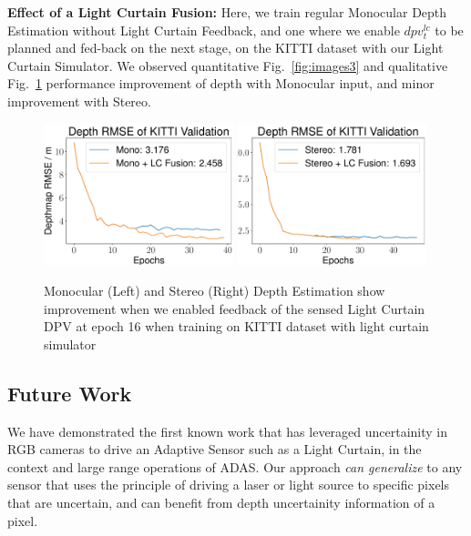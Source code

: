 \textbf{Effect of a Light Curtain Fusion:} Here, we train regular Monocular Depth Estimation without Light Curtain Feedback, and one where we enable $dpv_{t}^{lc}$ to be planned and fed-back on the next stage, on the KITTI dataset with our Light Curtain Simulator. We observed quantitative Fig.~\ref{fig:images3} and qualitative Fig.~\ref{fig:lfusion} performance improvement of depth with Monocular input, and minor improvement with Stereo.

\begin{figure}[h]
  \centering
  \begin{minipage}{0.5\textwidth}
      \centering
      \includegraphics[width=0.49\textwidth]{figures/Figure_10.pdf}
      \includegraphics[width=0.49\textwidth]{figures/Figure_11.pdf}
  \end{minipage}\hfill
  \centering
  \caption{Monocular (Left) and Stereo (Right) Depth Estimation show improvement when we enabled feedback of the sensed Light Curtain DPV at epoch 16 when training on KITTI dataset with light curtain simulator}
  \label{fig:lfusion} 
\end{figure}

\subsection{Future Work}

We have demonstrated the first known work that has leveraged uncertainity in RGB cameras to drive an Adaptive Sensor such as a Light Curtain, in the context and large range operations of ADAS. Our approach \textit{can generalize} to any sensor that uses the principle of driving a laser or light source to specific pixels that are uncertain, and can benefit from depth uncertainity information of a pixel. 

